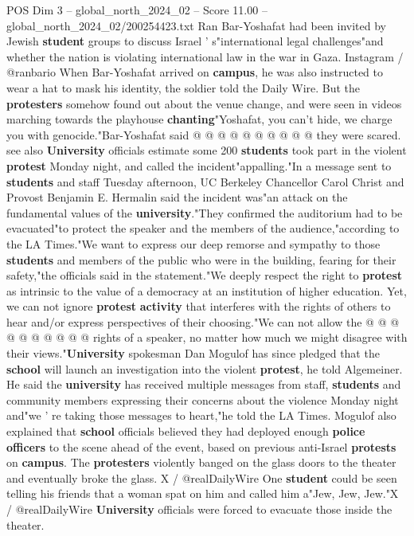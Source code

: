\begin{textsample}{POS Dim 3 – global\_north\_2024\_02 – Score 11.00 – global\_north\_2024\_02/200254423.txt}
Ran Bar-Yoshafat had been invited by Jewish \textbf{student} groups to discuss Israel ' s"international legal challenges"and whether the nation is violating international law in the war in Gaza.
Instagram / @ranbario When Bar-Yoshafat arrived on \textbf{campus}, he was also instructed to wear a hat to mask his identity, the soldier told the Daily Wire.
But the \textbf{protesters} somehow found out about the venue change, and were seen in videos marching towards the playhouse \textbf{chanting}"Yoshafat, you can't hide, we charge you with genocide."Bar-Yoshafat said @ @ @ @ @ @ @ @ @ @ they were scared. see also \textbf{University} officials estimate some 200 \textbf{students} took part in the violent \textbf{protest} Monday night, and called the incident"appalling."In a message sent to \textbf{students} and staff Tuesday afternoon, UC Berkeley Chancellor Carol Christ and Provost Benjamin E.
Hermalin said the incident was"an attack on the fundamental values of the \textbf{university}."They confirmed the auditorium had to be evacuated"to protect the speaker and the members of the audience,"according to the LA Times."We want to express our deep remorse and sympathy to those \textbf{students} and members of the public who were in the building, fearing for their safety,"the officials said in the statement."We deeply respect the right to \textbf{protest} as intrinsic to the value of a democracy at an institution of higher education.
Yet, we can not ignore \textbf{protest} \textbf{activity} that interferes with the rights of others to hear and/or express perspectives of their choosing."We can not allow the @ @ @ @ @ @ @ @ @ @ rights of a speaker, no matter how much we might disagree with their views."\textbf{University} spokesman Dan Mogulof has since pledged that the \textbf{school} will launch an investigation into the violent \textbf{protest}, he told Algemeiner.
He said the \textbf{university} has received multiple messages from staff, \textbf{students} and community members expressing their concerns about the violence Monday night and"we ' re taking those messages to heart,"he told the LA Times.
Mogulof also explained that \textbf{school} officials believed they had deployed enough \textbf{police} \textbf{officers} to the scene ahead of the event, based on previous anti-Israel \textbf{protests} on \textbf{campus}.
The \textbf{protesters} violently banged on the glass doors to the theater and eventually broke the glass.
X / @realDailyWire One \textbf{student} could be seen telling his friends that a woman spat on him and called him a"Jew, Jew, Jew."X / @realDailyWire \textbf{University} officials were forced to evacuate those inside the theater.

\end{textsample}
